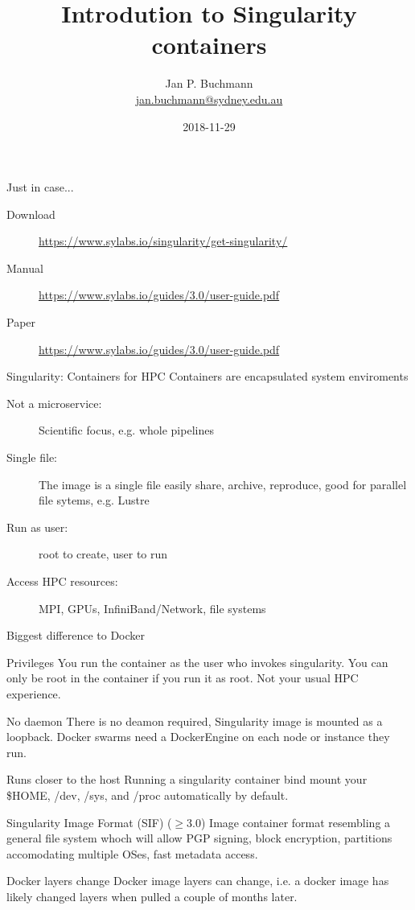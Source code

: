 \documentclass{beamer}
\title[]{Introdution to Singularity containers}
\subtitle{}
\author[]{Jan P. Buchmann\\\small{\href{mailto:jan.buchmann@sydney.edu.au}{jan.buchmann@sydney.edu.au}}}
\institute{The University Of Sydney}
\date{2018-11-29}
\begin{document}
  \titlepage

  \begin{frame}{Just in case...}
    \small
    \begin{description}
      \item[Download] \url{https://www.sylabs.io/singularity/get-singularity/}
      \item[Manual] \url{https://www.sylabs.io/guides/3.0/user-guide.pdf}
      \item[Paper] \url{https://www.sylabs.io/guides/3.0/user-guide.pdf}
    \end{description}
  \end{frame}

  \begin{frame}{Singularity: Containers for HPC}
   Containers are encapsulated system enviroments
    \begin{description}
      \item[Not a microservice:] Scientific focus, e.g. whole pipelines
      \item[Single file:] The image is a single file easily share, archive,
                          reproduce, good for parallel file sytems, e.g. Lustre
      \item[Run as user:] root to create, user to run
      \item[Access HPC resources:] MPI, GPUs, InfiniBand/Network, file systems
    \end{description}
  \end{frame}

  \begin{frame}{Biggest difference to Docker}
    \small
    \begin{block}{Privileges}
      You run the container as the user who invokes singularity. You can only
      be root in the container if you run it as root. Not your usual HPC
      experience.
    \end{block}
    \begin{block}{No daemon}
      There is no deamon required, Singularity image is mounted as a loopback.
      Docker swarms need a DockerEngine on each  node or instance they run.
    \end{block}
    \begin{block}{Runs closer to the host}
      Running a singularity container bind mount your \$HOME, /dev, /sys, and
      /proc automatically by default.
    \end{block}
    \begin{block}{Singularity Image Format (SIF) ($\geq$3.0)}
      Image container format resembling a general file system whoch will allow
      PGP signing, block encryption, partitions accomodating multiple OSes,
      fast metadata access.
    \end{block}
    \begin{block}{Docker layers change}
      Docker image layers can change, i.e. a docker image has likely changed
      layers when pulled a couple of months later.
    \end{block}
  \end{frame}
\end{document}
